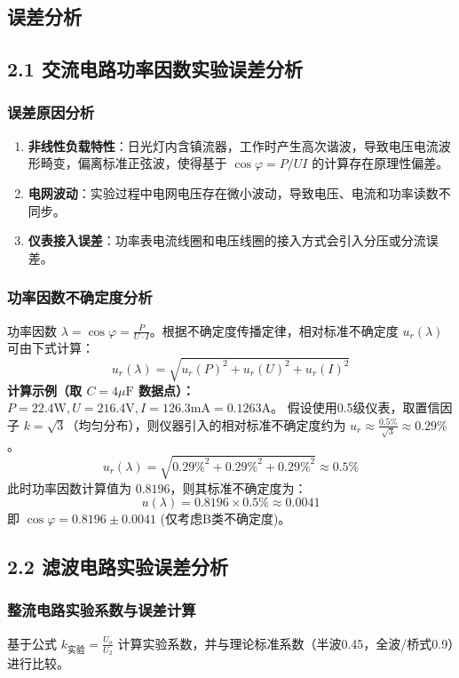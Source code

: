 \documentclass[]{../../templates/Report}%
\begin{document}
\begin{fullreportonly}
\section{误差分析}

\subsection{2.1 交流电路功率因数实验误差分析}

\subsubsection{误差原因分析}
\begin{enumerate}
    \item \textbf{非线性负载特性}：日光灯内含镇流器，工作时产生高次谐波，导致电压电流波形畸变，偏离标准正弦波，使得基于 $\cos\varphi = P/UI$ 的计算存在原理性偏差。
    \item \textbf{电网波动}：实验过程中电网电压存在微小波动，导致电压、电流和功率读数不同步。
    \item \textbf{仪表接入误差}：功率表电流线圈和电压线圈的接入方式会引入分压或分流误差。
\end{enumerate}

\subsubsection{功率因数不确定度分析}
功率因数 $\lambda = \cos\varphi = \frac{P}{U \cdot I}$。根据不确定度传播定律，相对标准不确定度 $u_r(\lambda)$ 可由下式计算：
$$ u_r(\lambda) = \sqrt{u_r(P)^2 + u_r(U)^2 + u_r(I)^2} $$
\textbf{计算示例（取 $C=4\mu\text{F}$ 数据点）：}
$P=22.4\text{W}, U=216.4\text{V}, I=126.3\text{mA}=0.1263\text{A}$。
假设使用0.5级仪表，取置信因子 $k=\sqrt{3}$（均匀分布），则仪器引入的相对标准不确定度约为 $u_r \approx \frac{0.5\%}{\sqrt{3}} \approx 0.29\%$。
$$ u_r(\lambda) = \sqrt{0.29\%^2 + 0.29\%^2 + 0.29\%^2} \approx 0.5\% $$
此时功率因数计算值为 $0.8196$，则其标准不确定度为：
$$ u(\lambda) = 0.8196 \times 0.5\% \approx 0.0041 $$
即 $\cos\varphi = 0.8196 \pm 0.0041$ (仅考虑B类不确定度)。

\subsection{2.2 滤波电路实验误差分析}

\subsubsection{整流电路实验系数与误差计算}
基于公式 $k_{\text{实验}} = \frac{U_o}{U_2}$ 计算实验系数，并与理论标准系数（半波0.45，全波/桥式0.9）进行比较。


\end{fullreportonly}
\end{document}
